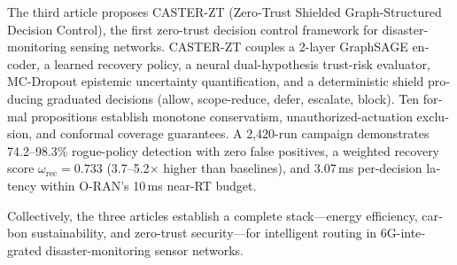 \begin{otherlanguage}{english}
The third article proposes CASTER-ZT (Zero-Trust Shielded Graph-Structured Decision Control), the first zero-trust decision control framework for disaster-monitoring sensing networks. CASTER-ZT couples a 2-layer GraphSAGE encoder, a learned recovery policy, a neural dual-hypothesis trust-risk evaluator, MC-Dropout epistemic uncertainty quantification, and a deterministic shield producing graduated decisions (allow, scope-reduce, defer, escalate, block). Ten formal propositions establish monotone conservatism, unauthorized-actuation exclusion, and conformal coverage guarantees. A 2,420-run campaign demonstrates 74.2--98.3\% rogue-policy detection with zero false positives, a weighted recovery score $\omega_{\text{rec}} = 0.733$ (3.7--5.2$\times$ higher than baselines), and 3.07\,ms per-decision latency within O-RAN's 10\,ms near-RT budget.

Collectively, the three articles establish a complete stack---energy efficiency, carbon sustainability, and zero-trust security---for intelligent routing in 6G-integrated disaster-monitoring sensor networks.

\end{otherlanguage}

